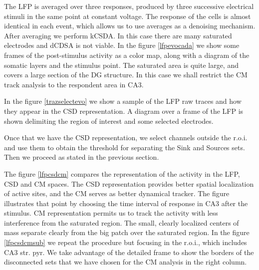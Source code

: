 \documentclass[utf8]{frontiersSCNS}
\begin{document}



The LFP is averaged over three responses, produced by three successive
electrical stimuli in the same point at constant voltage. The
response of the cells is almost identical in each event, which
allows us to use averages as a denoising mechanism. After averaging
we perform kCSDA. In this case there are
many saturated electrodes and dCDSA is not viable.
In the figure \ref{lfpevocada} we show some frames of the post-stimulus
activity as a color map, along
with a diagram of the somatic layers and the
stimulus point. The saturated area is quite large, and covers
a large section of the DG structure. In this case we shall
restrict the CM track analysis to the respondent area in CA3.

In the figure \ref{trazselectevo} we show a sample of the LFP
raw traces and how they appear in the CSD representation. A diagram
over a frame of the LFP is shown delimiting the region of interest and
some selected electrodes. 

Once that we have the CSD representation, we select channels outside
the r.o.i. and use them to obtain the threshold for separating
the Sink and Sources sets. Then we proceed as stated in the previous section.

The figure \ref{lfpcsdcm}  compares the representation of the activity in
the LFP, CSD and CM spaces. The CSD
representation provides better spatial localization of active sites, and the
CM serves as better dynamical tracker. The figure illustrates
that point by choosing the time interval of response in CA3 after the stimulus.
CM representation permits us to track the activity with less
interference from the saturated region. The small, clearly localized centers of
mass separate clearly from the big patch over the saturated region.
In the figure \ref{lfpcsdcmsub} we repeat the procedure but focusing in
the r.o.i., which includes CA3 str. pyr. We take advantage of the
detailed frame to show the borders of the disconnected sets that
we have chosen for the CM analysis in the right column.
\end{document}
